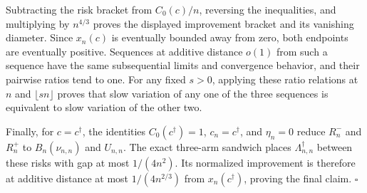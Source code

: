 Subtracting the risk bracket from \(C_0(c)/n\), reversing the inequalities, and multiplying by \(n^{4/3}\) proves the displayed improvement bracket and its vanishing diameter.  Since \(x_n(c)\) is eventually bounded away from zero, both endpoints are eventually positive.  Sequences at additive distance \(o(1)\) from such a sequence have the same subsequential limits and convergence behavior, and their pairwise ratios tend to one.  For any fixed \(s>0\), applying these ratio relations at \(n\) and \(\lfloor sn\rfloor\) proves that slow variation of any one of the three sequences is equivalent to slow variation of the other two.

Finally, for \(c=c^\dagger\), the identities \(C_0(c^\dagger)=1\), \(c_n=c^\dagger\), and \(\eta_n=0\) reduce \(R_n^-\) and \(R_n^+\) to \(B_n(\nu_{n,n})\) and \(U_{n,n}\).  The exact three-arm sandwich places \(\Lambda_{n,n}^\dagger\) between these risks with gap at most \(1/(4n^2)\).  Its normalized improvement is therefore at additive distance at most \(1/(4n^{2/3})\) from \(x_n(c^\dagger)\), proving the final claim. \(\square\)